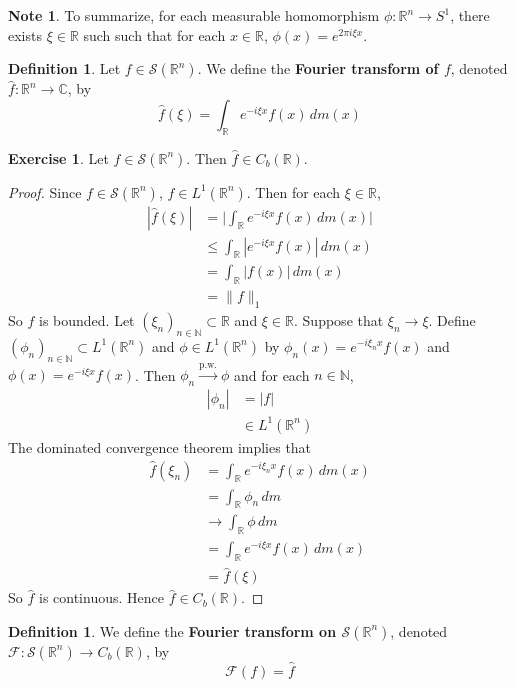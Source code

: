 \documentclass[12pt]{amsart}
\theoremstyle{definition}
\newtheorem{defn}[definition]{Definition}
\newtheorem{note}[definition]{Note}
\newtheorem{ex}[definition]{Exercise}
\newcommand{\C}{\mathbb{C}}
\newcommand{\N}{\mathbb{N}}
\newcommand{\R}{\mathbb{R}}
\newcommand{\MF}{\mathcal{F}}
\newcommand{\MS}{\mathcal{S}}
\newcommand{\dm}{\, d m}
\newcommand{\convt}[1]{\xrightarrow{\text{#1}}}
\begin{document}
	\begin{note}
		To summarize, for each measurable homomorphism $\phi:\R^n \rightarrow S^1$, there exists $\xi \in \R$ such  such that for each $x \in \R$, $\phi(x) = e^{2 \pi i  \xi x}$. 
	\end{note}
	
	\begin{defn}
		Let $f \in \MS(\R^n)$. We define the \textbf{Fourier transform of $f$}, denoted $\hat{f} : \R^n \rightarrow \C$, by $$ \hat{f}(\xi) = \int_{\R} e^{-i \xi x}f(x) \, dm(x)$$ 
	\end{defn}

	\begin{ex}
		Let $f \in \MS(\R^n)$. Then $\hat{f} \in C_b(\R)$.
	\end{ex}

	\begin{proof}
		Since $f \in \MS(\R^n)$, $f \in L^1(\R^n)$. Then for each $\xi \in \R$,
		\begin{align*}
			|\hat{f}(\xi)| 
			& = \bigg| \int_{\R} e^{-i\xi x}f(x) \dm(x) \bigg| \\
			& \leq \int_{\R} |e^{-i\xi x}f(x)| \dm(x) \\
			& = \int_{\R} |f(x)| \dm(x) \\
			& = \|f\|_1
		\end{align*}
		So $f$ is bounded. Let $(\xi_n)_{n \in \N} \subset \R$ and $\xi \in \R$. Suppose that $\xi_n \rightarrow \xi$. Define $(\phi_n)_{n \in \N} \subset L^1(\R^n)$ and $\phi \in L^1(\R^n)$ by $\phi_n(x) = e^{-i\xi_n x}f(x)$ and $\phi(x) = e^{-i\xi x}f(x)$. Then $\phi_n \convt{p.w.} \phi$ and for each $n \in \N$, 
		\begin{align*}
			|\phi_n|
			& = |f| \\
			& \in L^1(\R^n)
		\end{align*}
		The dominated convergence theorem implies that 
		\begin{align*}
			\hat{f}(\xi_n)
			& = \int_{\R} e^{-i\xi_n x}f(x) \dm(x) \\
			& = \int_{\R} \phi_n \dm \\
			& \rightarrow \int_{\R} \phi \dm \\
			& = \int_{\R} e^{-i\xi x}f(x) \dm(x) \\
			& = \hat{f}(\xi)
		\end{align*}
		So $\hat{f}$ is continuous. Hence $\hat{f} \in C_b(\R)$.
	\end{proof}

	\begin{defn}
		We define the \textbf{Fourier transform on $\MS(\R^n)$}, denoted $\MF: \MS(\R^n) \rightarrow C_b(\R)$, by 
		$$\MF(f) = \hat{f}$$
	\end{defn}
	
\end{document}
